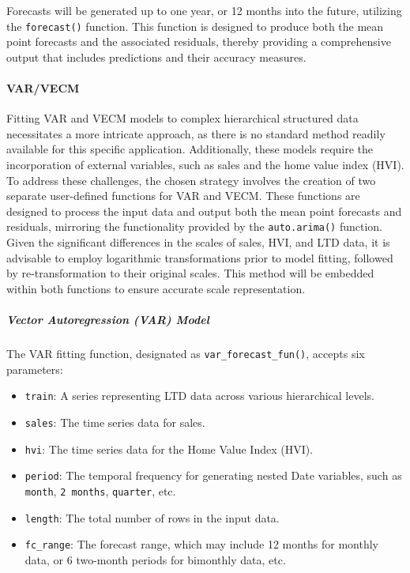 \documentclass[11pt,a4paper,]{article}
\providecommand{\tightlist}{%
  \setlength{\itemsep}{0pt}\setlength{\parskip}{0pt}}
\begin{document}
Forecasts will be generated up to one year, or 12 months into the future, utilizing the \texttt{forecast()} function. This function is designed to produce both the mean point forecasts and the associated residuals, thereby providing a comprehensive output that includes predictions and their accuracy measures.

\paragraph{VAR/VECM}\label{varvecm}

Fitting VAR and VECM models to complex hierarchical structured data necessitates a more intricate approach, as there is no standard method readily available for this specific application. Additionally, these models require the incorporation of external variables, such as sales and the home value index (HVI). To address these challenges, the chosen strategy involves the creation of two separate user-defined functions for VAR and VECM. These functions are designed to process the input data and output both the mean point forecasts and residuals, mirroring the functionality provided by the \texttt{auto.arima()} function. Given the significant differences in the scales of sales, HVI, and LTD data, it is advisable to employ logarithmic transformations prior to model fitting, followed by re-transformation to their original scales. This method will be embedded within both functions to ensure accurate scale representation.

\subparagraph{Vector Autoregression (VAR) Model}\label{vector-autoregression-var-model}

The VAR fitting function, designated as \texttt{var\_forecast\_fun()}, accepts six parameters:

\begin{itemize}
\tightlist
\item
  \texttt{train}: A series representing LTD data across various hierarchical levels.
\item
  \texttt{sales}: The time series data for sales.
\item
  \texttt{hvi}: The time series data for the Home Value Index (HVI).
\item
  \texttt{period}: The temporal frequency for generating nested Date variables, such as \texttt{month}, \texttt{2\ months}, \texttt{quarter}, etc.
\item
  \texttt{length}: The total number of rows in the input data.
\item
  \texttt{fc\_range}: The forecast range, which may include 12 months for monthly data, or 6 two-month periods for bimonthly data, etc.
\end{itemize}
\end{document}
